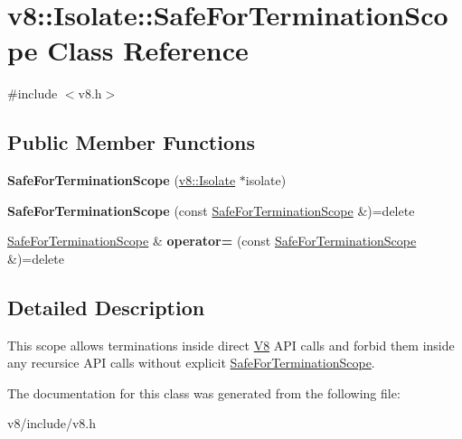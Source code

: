 \hypertarget{classv8_1_1Isolate_1_1SafeForTerminationScope}{}\section{v8\+:\+:Isolate\+:\+:Safe\+For\+Termination\+Scope Class Reference}
\label{classv8_1_1Isolate_1_1SafeForTerminationScope}


{\ttfamily \#include $<$v8.\+h$>$}

\subsection*{Public Member Functions}
\begin{DoxyCompactItemize}
\item 
\mbox{\label{classv8_1_1Isolate_1_1SafeForTerminationScope_aa68b3979df8fef65b1e7afa9cd9bba03}} 
{\bfseries Safe\+For\+Termination\+Scope} (\mbox{\hyperlink{classv8_1_1Isolate}{v8\+::\+Isolate}} $\ast$isolate)
\item 
\mbox{\label{classv8_1_1Isolate_1_1SafeForTerminationScope_aa7041e87a889e8d4d8cdbca6b5adfa0d}} 
{\bfseries Safe\+For\+Termination\+Scope} (const \mbox{\hyperlink{classv8_1_1Isolate_1_1SafeForTerminationScope}{Safe\+For\+Termination\+Scope}} \&)=delete
\item 
\mbox{\label{classv8_1_1Isolate_1_1SafeForTerminationScope_ab4425468e50b70e5f0b8a7f438e609fa}} 
\mbox{\hyperlink{classv8_1_1Isolate_1_1SafeForTerminationScope}{Safe\+For\+Termination\+Scope}} \& {\bfseries operator=} (const \mbox{\hyperlink{classv8_1_1Isolate_1_1SafeForTerminationScope}{Safe\+For\+Termination\+Scope}} \&)=delete
\end{DoxyCompactItemize}


\subsection{Detailed Description}
This scope allows terminations inside direct \mbox{\hyperlink{classv8_1_1V8}{V8}} A\+PI calls and forbid them inside any recursice A\+PI calls without explicit \mbox{\hyperlink{classv8_1_1Isolate_1_1SafeForTerminationScope}{Safe\+For\+Termination\+Scope}}. 

The documentation for this class was generated from the following file\+:\begin{DoxyCompactItemize}
\item 
v8/include/v8.\+h\end{DoxyCompactItemize}
